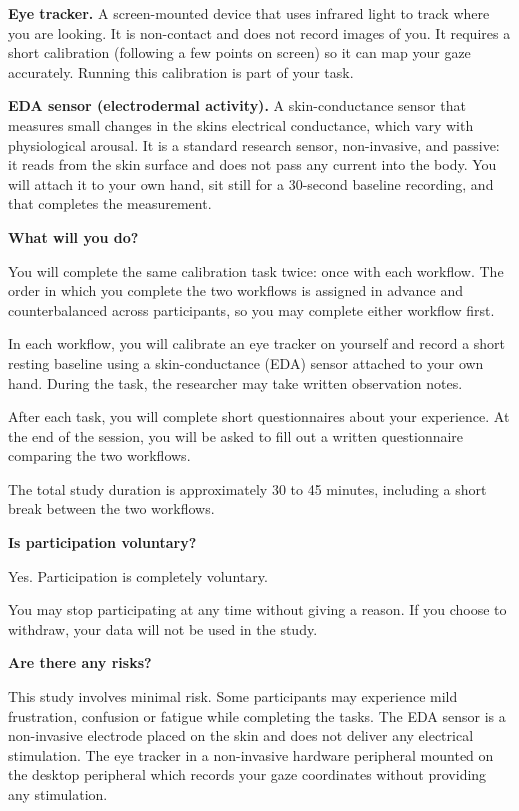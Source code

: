 \documentclass[
]{article}
\begin{document}
\textbf{Eye tracker.} A screen-mounted device that uses infrared light to track where you are looking. It is non-contact and does not record images of you. It requires a short calibration (following a few points on screen) so it can map your gaze accurately. Running this calibration is part of your task.

\textbf{EDA sensor (electrodermal activity).} A skin-conductance sensor that measures small changes in the skin\textquotesingle s electrical conductance, which vary with physiological arousal. It is a standard research sensor, non-invasive, and passive: it reads from the skin surface and does not pass any current into the body. You will attach it to your own hand, sit still for a 30-second baseline recording, and that completes the measurement.

\textbf{What will you do?}

You will complete the same calibration task twice: once with each workflow. The order in which you complete the two workflows is assigned in advance and counterbalanced across participants, so you may complete either workflow first.

In each workflow, you will calibrate an eye tracker on yourself and record a short resting baseline using a skin-conductance (EDA) sensor attached to your own hand. During the task, the researcher may take written observation notes.

After each task, you will complete short questionnaires about your experience. At the end of the session, you will be asked to fill out a written questionnaire comparing the two workflows.

The total study duration is approximately 30 to 45 minutes, including a short break between the two workflows.

\textbf{Is participation voluntary?}

Yes. Participation is completely voluntary.

You may stop participating at any time without giving a reason. If you choose to withdraw, your data will not be used in the study.

\textbf{Are there any risks?}

This study involves minimal risk. Some participants may experience mild frustration, confusion or fatigue while completing the tasks. The EDA sensor is a non-invasive electrode placed on the skin and does not deliver any electrical stimulation. The eye tracker in a non-invasive hardware peripheral mounted on the desktop peripheral which records your gaze coordinates without providing any stimulation.
\end{document}
